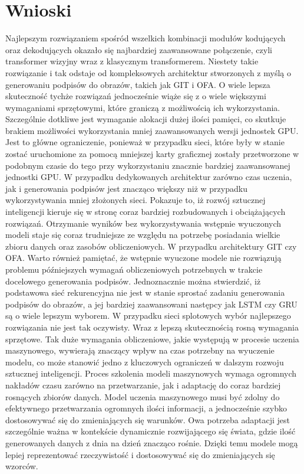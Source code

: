 \newpage %
\section{Wnioski}
Najlepszym rozwiązaniem spośród wszelkich kombinacji modułów kodujących oraz dekodujących okazało się najbardziej zaawansowane połączenie, czyli transformer wizyjny wraz z klasycznym transformerem. Niestety takie rozwiązanie i tak odstaje od kompleksowych architektur stworzonych z myślą o generowaniu podpisów do obrazów, takich jak GIT i OFA. O wiele lepsza skuteczność tychże rozwiązań jednocześnie wiąże się z o wiele większymi wymaganiami sprzętowymi, które graniczą z możliwością ich wykorzystania. Szczególnie dotkliwe jest wymaganie alokacji dużej ilości pamięci, co skutkuje brakiem możliwości wykorzystania mniej zaawansowanych wersji jednostek GPU. Jest to główne ograniczenie, ponieważ w przypadku sieci, które były w stanie zostać uruchomione za pomocą mniejszej karty graficznej zostały przetworzone w podobnym czasie do tego przy wykorzystaniu znacznie bardziej zaawansowanej jednostki GPU. W przypadku dedykowanych architektur zarówno czas uczenia, jak i generowania podpisów jest znacząco większy niż w przypadku wykorzystywania mniej złożonych sieci. Pokazuje to, iż rozwój sztucznej inteligencji kieruje się w stronę coraz bardziej rozbudowanych i obciążających rozwiązań. Otrzymanie wyników bez wykorzystywania wstępnie wyuczonych modeli staje się coraz trudniejsze ze względu na potrzebę posiadania wielkie zbioru danych oraz zasobów obliczeniowych. W przypadku architektury GIT czy OFA. Warto również pamiętać, że wstępnie wyuczone modele nie rozwiązują problemu późniejszych wymagań obliczeniowych potrzebnych w trakcie docelowego generowania podpisów. Jednoznacznie można stwierdzić, iż podstawowa sieć rekurencyjna nie jest w stanie sprostać zadaniu generowania podpisów do obrazów, a jej bardziej zaawansowani następcy jak LSTM czy GRU są o wiele lepszym wyborem. W przypadku sieci splotowych wybór najlepszego rozwiązania nie jest tak oczywisty. Wraz z lepszą skutecznością rosną wymagania sprzętowe. Tak duże wymagania obliczeniowe, jakie występują w procesie uczenia maszynowego, wywierają znaczący wpływ na czas potrzebny na wyuczenie modelu, co może stanowić jedno z kluczowych ograniczeń w dalszym rozwoju sztucznej inteligencji. Proces szkolenia modeli maszynowych wymaga ogromnych nakładów czasu zarówno na przetwarzanie, jak i adaptację do coraz bardziej rosnących zbiorów danych. Model uczenia maszynowego musi być zdolny do efektywnego przetwarzania ogromnych ilości informacji, a jednocześnie szybko dostosowywać się do zmieniających się warunków. Owa potrzeba adaptacji jest szczególnie ważna w kontekście dynamicznie rozwijającego się świata, gdzie ilość generowanych danych z dnia na dzień znacząco rośnie. Dzięki temu modele mogą lepiej reprezentować rzeczywistość i dostosowywać się do zmieniających się wzorców.

